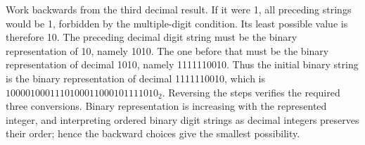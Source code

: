 Work backwards from the third decimal result. If it were 1, all preceding strings would be 1, forbidden by the multiple-digit condition. Its least possible value is therefore 10. The preceding decimal digit string must be the binary representation of 10, namely 1010. The one before that must be the binary representation of decimal 1010, namely 1111110010. Thus the initial binary string is the binary representation of decimal 1111110010, which is $\boxed{1000010001110100011000101111010_2}$. Reversing the steps verifies the required three conversions. Binary representation is increasing with the represented integer, and interpreting ordered binary digit strings as decimal integers preserves their order; hence the backward choices give the smallest possibility.
